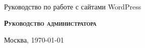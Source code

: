 \begin{titlepage}
\newpage
\clearpage\maketitle
\thispagestyle{empty}

\begin{center}
\CompanyName \\
\vspace{0.1cm}
\hrulefill
\end{center}
 

\vspace{8em}

\begin{center}
\Large Руководство по работе с сайтами WordPress
\end{center}

\vspace{2.5em}
 
\begin{center}
\textsc{\textbf{Руководство администратора}}
\end{center}

\vspace{6em}
 

 
\vspace{\fill}

\begin{center}
Москва, \today
\end{center}

\end{titlepage}